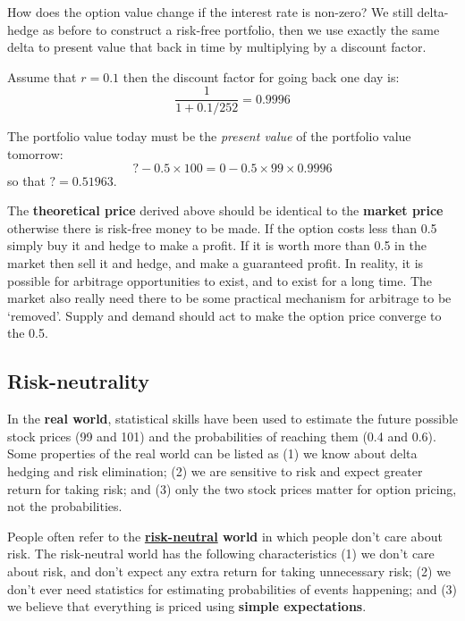 \begin{center}
\begin{footnotesize}
{\begin{minipage}{0.90\textwidth}
How does the option value change if the interest rate is non-zero? We still delta-hedge as before to construct a risk-free portfolio, then we use exactly the same delta to present value that back in time by multiplying by a discount factor. 

Assume that $r = 0.1$ then the discount factor for going back one day is:
\begin{equation}
    \frac{1}{1+0.1/252} = 0.9996
\end{equation}

The portfolio value today must be the \textit{present value} of the portfolio value tomorrow:
\begin{equation}
    ? - 0.5 \times 100 = 0 - 0.5 \times 99 \times 0.9996
\end{equation}
so that $? = 0.51963$.
\end{minipage}
}
\end{footnotesize}
\end{center}

The \textbf{theoretical price} derived above should be identical to the \textbf{market price} otherwise there is risk-free money to be made. If the option costs less than 0.5 simply buy it and hedge to make a profit. If it is worth more than 0.5 in the market then sell it and hedge, and make a guaranteed profit. In reality, it is possible for arbitrage opportunities to exist, and to exist for a long time. The market also really need there to be some practical mechanism for arbitrage to be `removed'. Supply and demand should act to make the option price converge to the 0.5.


\subsection{Risk-neutrality}
In the \textbf{real world}, statistical skills have been used to estimate the future possible stock prices (99 and 101) and the probabilities of reaching them (0.4 and 0.6). Some properties of the real world can be listed as (1) we know about delta hedging and risk elimination; (2) we are sensitive to risk and expect greater return for taking risk; and (3) only the two stock prices matter for option pricing, not the probabilities.

People often refer to the \textbf{\href{https://www.investopedia.com/terms/r/riskneutral.asp}{risk-neutral} world} in which people don't care about risk. The risk-neutral world has the following characteristics (1) we don't care about risk, and don't expect any extra return for taking unnecessary risk; (2) we don't ever need statistics for estimating probabilities of events happening; and (3) we believe that everything is priced using \textbf{simple expectations}.

